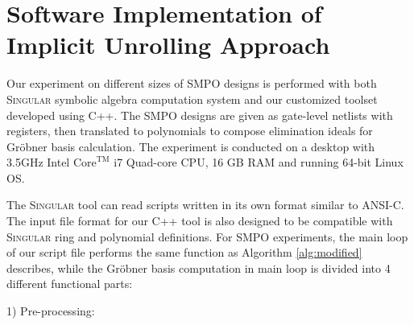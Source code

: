 \section{Software Implementation of Implicit Unrolling Approach}
Our experiment on different sizes of SMPO designs is performed with both \textsc{Singular} \cite{DGPS}
symbolic algebra computation system and our customized toolset developed using C++.
The SMPO designs are given as gate-level netlists with registers, then translated to polynomials to compose
elimination ideals for Gr\"obner basis calculation. The experiment is conducted on a desktop with
3.5GHz Intel $\text{Core}^\text{TM}$ i7 Quad-core CPU, 16 GB RAM and running 64-bit Linux OS.

The \textsc{Singular} tool can read scripts written in its own format similar to ANSI-C. 
The input file format for our C++ tool is also designed to be compatible with \textsc{Singular} 
ring and polynomial definitions. For SMPO experiments, the main 
loop of our script file performs the same function as Algorithm \ref{alg:modified} describes, while the Gr\"obner basis
computation in main loop is divided into 4 different functional parts:

1) Pre-processing:


